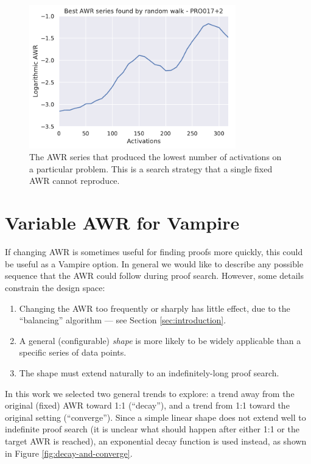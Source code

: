 \documentclass{llncs}
\begin{document}
\begin{figure}
	\centering
	\includegraphics[width=0.8\textwidth]{random-walk}
	\caption{The AWR series that produced the lowest number of activations on a particular problem. This is a search strategy that a single fixed AWR cannot reproduce.}
	\label{fig:random-walk}
\end{figure}

\section{Variable AWR for Vampire}
If changing AWR is sometimes useful for finding proofs more quickly, this could be useful as a Vampire option.
In general we would like to describe any possible sequence that the AWR could follow during proof search.
However, some details constrain the design space:
\begin{enumerate}
	\item Changing the AWR too frequently or sharply has little effect, due to the ``balancing'' algorithm --- see Section \ref{sec:introduction}.
	\item A general (configurable) \emph{shape} is more likely to be widely applicable than a specific series of data points.
	\item The shape must extend naturally to an indefinitely-long proof search.
\end{enumerate}

In this work we selected two general trends to explore: a trend away from the original (fixed) AWR toward 1:1 (``decay''), and a trend from 1:1 toward the original setting (``converge'').
Since a simple linear shape does not extend well to indefinite proof search (it is unclear what should happen after either 1:1 or the target AWR is reached), an exponential decay function is used instead, as shown in Figure \ref{fig:decay-and-converge}.
\end{document}
